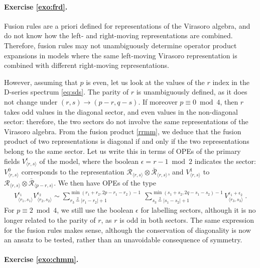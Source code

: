 \documentclass[12pt, a4paper]{article}
\theoremstyle{break}
\begin{document}
\paragraph{Exercise \ref{exo:frd}.}

Fusion rules are a priori defined for representations of the Virasoro algebra, and do not know how the left- and right-moving representations are combined. Therefore, fusion rules may not unambiguously determine operator product expansions in models where the same left-moving Virasoro representation is combined with different right-moving representations. 

However, assuming that $p$ is even, let us look at the values of the $r$ index in the D-series spectrum \eqref{eq:sds}. The parity of $r$ is unambiguously defined, as it does not change under $(r,s)\to (p-r,q-s)$. If moreover $p\equiv 0 \bmod 4$, then $r$ takes odd values in the diagonal sector, and even values in the non-diagonal sector: therefore, the two sectors do not involve the same representations of the Virasoro algebra. From the fusion product \eqref{rrmm}, we deduce that the fusion product of two representations is diagonal if and only if the two representations belong to the same sector. Let us write this in terms of OPEs of the primary fields $V^\epsilon_{\langle r,s\rangle}$ of the model, where the boolean $\epsilon = r-1\bmod 2$ indicates the sector: $V^0_{\langle r,s\rangle}$ corresponds to the representation $\mathcal{R}_{ \langle r,s\rangle} \otimes \bar{\mathcal{R}}_{\langle r,s\rangle}$, and $V^1_{\langle r,s\rangle}$ to $\mathcal{R}_{\langle r,s\rangle} \otimes \bar{\mathcal{R}}_{\langle p-r,s\rangle}$. We then have OPEs of the type 
\begin{align}
 V^{\epsilon_1}_{\langle r_1,s_1\rangle}V^{\epsilon_2}_{\langle r_2,s_2\rangle} \sim \sum_{r_3\overset{2}{=}|r_1-r_2|+1}^{\min(r_1+r_2,2p-r_1-r_2)-1}\ \sum_{s_3\overset{2}{=}|s_1-s_2|+1}^{\min(s_1+s_2,2q-s_1-s_2)-1} V^{\epsilon_1+\epsilon_2}_{\langle r_3,s_3\rangle}\ .
\end{align}
For $p\equiv 2\bmod 4$, we still use the boolean $\epsilon$ for labelling sectors, although it is no longer related to the parity of $r$, as $r$ is odd in both sectors. The same expression for the fusion rules makes sense, although the conservation of diagonality is now an ansatz to be tested, rather than an unavoidable consequence of symmetry.

\paragraph{Exercise \ref{exo:chmm}.}
\end{document}
